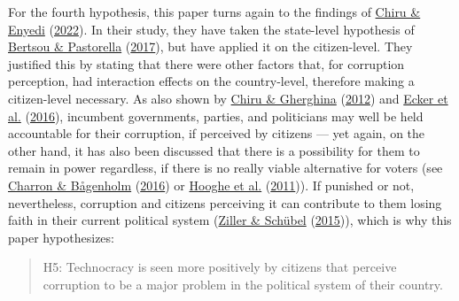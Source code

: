 \documentclass[
  12pt,
  english,
]{article}
\begin{document}
For the fourth hypothesis, this paper turns again to the findings of
\protect\hyperlink{ref-chiru2022wants}{Chiru \& Enyedi}
(\protect\hyperlink{ref-chiru2022wants}{2022}). In their study, they
have taken the state-level hypothesis of
\protect\hyperlink{ref-bertsou2017technocratic}{Bertsou \& Pastorella}
(\protect\hyperlink{ref-bertsou2017technocratic}{2017}), but have
applied it on the citizen-level. They justified this by stating that
there were other factors that, for corruption perception, had
interaction effects on the country-level, therefore making a
citizen-level necessary. As also shown by
\protect\hyperlink{ref-chiru2012voter}{Chiru \& Gherghina}
(\protect\hyperlink{ref-chiru2012voter}{2012}) and
\protect\hyperlink{ref-ecker2016corruption}{Ecker et al.}
(\protect\hyperlink{ref-ecker2016corruption}{2016}), incumbent
governments, parties, and politicians may well be held accountable for
their corruption, if perceived by citizens --- yet again, on the other
hand, it has also been discussed that there is a possibility for them to
remain in power regardless, if there is no really viable alternative for
voters (see \protect\hyperlink{ref-charron2016ideology}{Charron \&
Bågenholm} (\protect\hyperlink{ref-charron2016ideology}{2016}) or
\protect\hyperlink{ref-hooghe2011distrusting}{Hooghe et al.}
(\protect\hyperlink{ref-hooghe2011distrusting}{2011})). If punished or
not, nevertheless, corruption and citizens perceiving it can contribute
to them losing faith in their current political system
(\protect\hyperlink{ref-ziller2015pure}{Ziller \& Schübel}
(\protect\hyperlink{ref-ziller2015pure}{2015})), which is why this paper
hypothesizes:

\begin{quote}
H5: Technocracy is seen more positively by citizens that perceive
corruption to be a major problem in the political system of their
country.
\end{quote}
\end{document}
